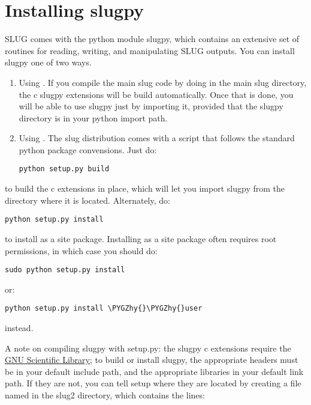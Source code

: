 \documentclass[letterpaper,10pt,english]{sphinxmanual}
\def\PYGZhy{\char`\-}
\begin{document}
\section{Installing slugpy}
\label{slugpy:installing-slugpy}
SLUG comes with the python module slugpy, which contains an extensive set of routines for reading, writing, and manipulating SLUG outputs. You can install slugpy one of two ways.
\begin{enumerate}
\item {} 
Using . If you compile the main slug code by doing  in the main slug directory, the c slugpy extensions will be build automatically. Once that is done, you will be able to use slugpy just by importing it, provided that the slugpy directory is in your python import path.

\item {} 
Using . The slug distribution comes with a  script that follows the standard python package convensions. Just do:

\begin{Verbatim}[commandchars=\\\{\}]
python setup.py build
\end{Verbatim}

\end{enumerate}

to build the c extensions in place, which will let you import slugpy from the directory where it is located. Alternately, do:

\begin{Verbatim}[commandchars=\\\{\}]
python setup.py install
\end{Verbatim}

to install as a site package. Installing as a site package often requires root permissions, in which case you should do:

\begin{Verbatim}[commandchars=\\\{\}]
sudo python setup.py install
\end{Verbatim}

or:

\begin{Verbatim}[commandchars=\\\{\}]
python setup.py install \PYGZhy{}\PYGZhy{}user
\end{Verbatim}

instead.

A note on compiling slugpy with setup.py: the slugpy c extensions require the \href{http://www.gnu.org/software/gsl/}{GNU Scientific Library}; to build or install slugpy, the appropriate headers must be in your default include path, and the appropriate libraries in your default link path. If they are not, you can tell setup where they are located by creating a file named  in the slug2 directory, which contains the lines:
\end{document}
